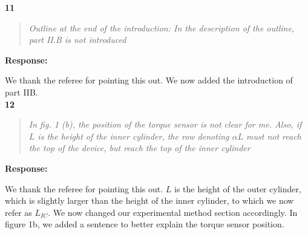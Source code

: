 \documentclass[10pt]{article}
\newcommand{\strong}[1]{\textbf{#1}}
\newcommand{\question}[1]{\begin{quote} \emph{#1}  \end{quote} }
\begin{document}
\noindent \strong{11}

\question{Outline at the end of the introduction: In the description of the outline, part II.B is not introduced }

\noindent \strong{Response:} 

\noindent We thank the referee for pointing this out. We now added the introduction of part IIB. \\

\noindent \strong{12}

\question{In fig. 1 (b), the position of the torque sensor is not clear for me. Also, if $L$ is the height of the inner cylinder, the row denoting $\alpha L$ must not reach the top of the device, but reach the top of the inner cylinder }

\noindent \strong{Response:} 

\noindent We thank the referee for pointing this out. $L$ is the height of the outer cylinder, which is slightly larger than the height of the inner cylinder, to which we now refer as $L_{IC}$. We now changed our experimental method section accordingly. In figure 1b, we added a sentence to better explain the torque sensor position.\\






	
\end{document}
